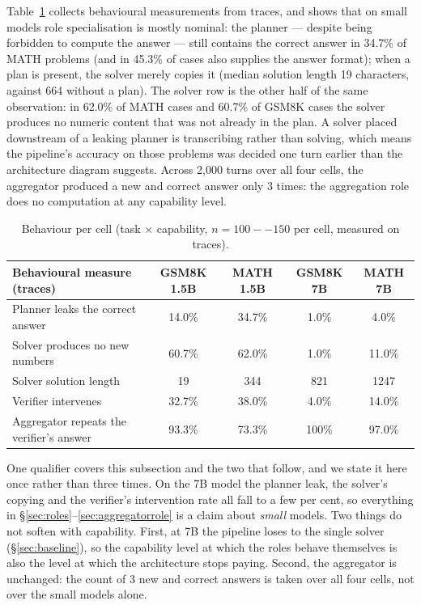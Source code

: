 \documentclass[11pt,a4paper]{article}
\begin{document}
Table~\ref{tab:behavior} collects behavioural measurements from traces, and shows that on small models role specialisation is mostly nominal: the planner --- despite being forbidden to compute the answer --- still contains the correct answer in 34.7\% of MATH problems (and in 45.3\% of cases also supplies the answer format); when a plan is present, the solver merely copies it (median solution length 19 characters, against 664 without a plan). The solver row is the other half of the same observation: in 62.0\% of MATH cases and 60.7\% of GSM8K cases the solver produces no numeric content that was not already in the plan. A solver placed downstream of a leaking planner is transcribing rather than solving, which means the pipeline's accuracy on those problems was decided one turn earlier than the architecture diagram suggests. Across 2{,}000 turns over all four cells, the aggregator produced a new and correct answer only 3 times: the aggregation role does no computation at any capability level.

\begin{table}[h]\centering\small
\begin{tabular}{@{}l c c c c@{}}
\toprule
Behavioural measure (traces) & GSM8K 1.5B & MATH 1.5B & GSM8K 7B & MATH 7B\\
\midrule
Planner leaks the correct answer & 14.0\% & 34.7\% & 1.0\% & 4.0\%\\
Solver produces no new numbers & 60.7\% & 62.0\% & 1.0\% & 11.0\%\\
Solver solution length & 19 & 344 & 821 & 1247\\
Verifier intervenes & 32.7\% & 38.0\% & 4.0\% & 14.0\%\\
Aggregator repeats the verifier's answer & 93.3\% & 73.3\% & 100\% & 97.0\%\\
\bottomrule
\end{tabular}
\caption{Behaviour per cell (task $\times$ capability, $n=100--150$ per cell, measured on traces).}
\label{tab:behavior}
\end{table}

One qualifier covers this subsection and the two that follow, and we state it here once rather than three times. On the 7B model the planner leak, the solver's copying and the verifier's intervention rate all fall to a few per cent, so everything in \S\ref{sec:roles}--\ref{sec:aggregatorrole} is a claim about \emph{small} models. Two things do not soften with capability. First, at 7B the pipeline loses to the single solver (\S\ref{sec:baseline}), so the capability level at which the roles behave themselves is also the level at which the architecture stops paying. Second, the aggregator is unchanged: the count of 3 new and correct answers is taken over all four cells, not over the small models alone.
\end{document}
